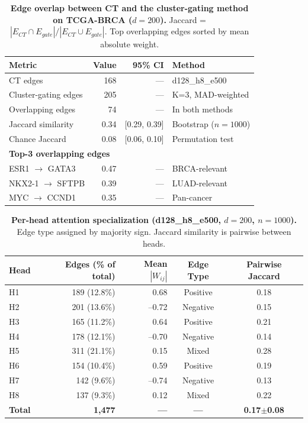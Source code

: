 \documentclass[12pt,a4paper]{article}
\begin{document}
\newpage
\begin{table}[H]
\centering
\caption{\textbf{Edge overlap between CT and the cluster-gating method on TCGA-BRCA ($d=200$).} Jaccard = $|E_{CT} \cap E_{gate}| / |E_{CT} \cup E_{gate}|$. Top overlapping edges sorted by mean absolute weight.}
\label{tab:s_edge_overlap}
\small
\begin{tabular}{lrrl}
\toprule
Metric & Value & 95\% CI & Method \\
\midrule
CT edges & 168 & --- & d128\_h8\_e500 \\
Cluster-gating edges & 205 & --- & K=3, MAD-weighted \\
Overlapping edges & 74 & --- & In both methods \\
Jaccard similarity & 0.34 & [0.29, 0.39] & Bootstrap ($n=1000$) \\
Chance Jaccard & 0.08 & [0.06, 0.10] & Permutation test \\
\midrule
\multicolumn{4}{l}{\textbf{Top-3 overlapping edges}} \\
ESR1 $\to$ GATA3 & 0.47 & --- & BRCA-relevant \\
NKX2-1 $\to$ SFTPB & 0.39 & --- & LUAD-relevant \\
MYC $\to$ CCND1 & 0.35 & --- & Pan-cancer \\
\bottomrule
\end{tabular}
\end{table}
\newpage
\begin{table}[H]
\centering
\caption{\textbf{Per-head attention specialization (d128\_h8\_e500, $d=200$, $n=1000$).} Edge type assigned by majority sign. Jaccard similarity is pairwise between heads.}
\label{tab:s_head_specialization}
\small
\begin{tabular}{lrrcc}
\toprule
Head & Edges (\% of total) & Mean $|W_{ij}|$ & Edge Type & Pairwise Jaccard \\
\midrule
H1 & 189 (12.8\%) & 0.68 & Positive & 0.18 \\
H2 & 201 (13.6\%) & --0.72 & Negative & 0.15 \\
H3 & 165 (11.2\%) & 0.64 & Positive & 0.21 \\
H4 & 178 (12.1\%) & --0.70 & Negative & 0.14 \\
H5 & 311 (21.1\%) & 0.15 & Mixed & 0.28 \\
H6 & 154 (10.4\%) & 0.59 & Positive & 0.19 \\
H7 & 142 (9.6\%) & --0.74 & Negative & 0.13 \\
H8 & 137 (9.3\%) & 0.12 & Mixed & 0.22 \\
\midrule
\textbf{Total} & \textbf{1,477} & \textbf{---} & \textbf{---} & \textbf{0.17$\pm$0.08} \\
\bottomrule
\end{tabular}
\end{table}
\end{document}
